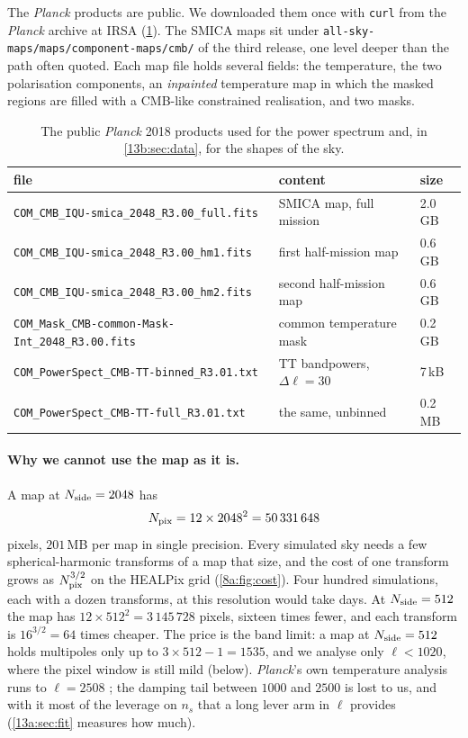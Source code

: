 The \textit{Planck} products are public. We downloaded them once with \texttt{curl} from the \textit{Planck}
archive at IRSA (\cref{13a:tab:files}). The SMICA maps sit under \texttt{all-sky-maps/maps/component-maps/cmb/}
of the third release, one level deeper than the path often quoted. Each map file holds several fields:
the temperature, the two polarisation components, an \emph{inpainted} temperature map in which the masked
regions are filled with a CMB-like constrained realisation, and two masks.

\begin{table}[htbp]
\centering\footnotesize
\begin{tabular}{@{}lll@{}}
\toprule
file & content & size\\
\midrule
\texttt{COM\_CMB\_IQU-smica\_2048\_R3.00\_full.fits} & SMICA map, full mission & 2.0\,GB\\
\texttt{COM\_CMB\_IQU-smica\_2048\_R3.00\_hm1.fits} & first half-mission map & 0.6\,GB\\
\texttt{COM\_CMB\_IQU-smica\_2048\_R3.00\_hm2.fits} & second half-mission map & 0.6\,GB\\
\texttt{COM\_Mask\_CMB-common-Mask-Int\_2048\_R3.00.fits} & common temperature mask & 0.2\,GB\\
\texttt{COM\_PowerSpect\_CMB-TT-binned\_R3.01.txt} & TT bandpowers, $\Delta\ell=30$ & 7\,kB\\
\texttt{COM\_PowerSpect\_CMB-TT-full\_R3.01.txt} & the same, unbinned & 0.2\,MB\\
\bottomrule
\end{tabular}
\caption{The public \textit{Planck} 2018 products used for the power spectrum and, in \cref{13b:sec:data}, for the shapes of the sky.}
\label{13a:tab:files}
\end{table}

\paragraph{Why we cannot use the map as it is.} A map at $N_{\rm side}=2048$ has
\[
  N_{\rm pix}=12\times2048^2=50\,331\,648
\]
pixels, $201$\,MB per map in single precision. Every simulated sky needs a few spherical-harmonic
transforms of a map that size, and the cost of one transform grows as $N_{\rm pix}^{3/2}$ on the HEALPix grid
(\cref{8a:fig:cost}). Four hundred simulations, each with a dozen transforms, at this resolution would take
days. At $N_{\rm side}=512$ the map has $12\times512^2=3\,145\,728$ pixels, sixteen times fewer, and each
transform is $16^{3/2}=64$ times cheaper. The price is the band limit: a map at $N_{\rm side}=512$ holds
multipoles only up to $3\times512-1=1535$, and we analyse only $\ell<1020$, where the pixel window is still
mild (below). \textit{Planck}'s own temperature analysis runs to $\ell=2508$ \cite[Table~13]{Planck2018V}; the
damping tail between $1000$ and $2500$ is lost to us, and with it most of the leverage on $n_s$ that a long
lever arm in $\ell$ provides (\cref{13a:sec:fit} measures how much).

